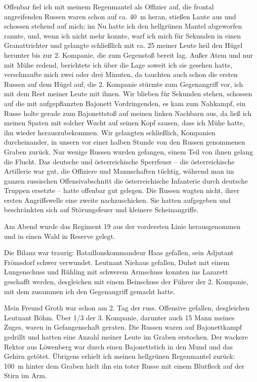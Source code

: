 \documentclass[a5paper,pagesize,10pt,twoside=true]{scrbook}
\begin{document}
Offenbar fiel ich mit meinem Regenmantel als Offizier auf, die frontal angreifenden Russen waren schon auf ca. 40~m heran, stießen Laute aus und schossen stehend auf mich; im Nu hatte ich den hellgrünen Mantel abgeworfen rannte, und, wenn ich nicht mehr konnte, warf ich mich für Sekunden in einen Granattrichter und gelangte schließlich mit ca. 25 meiner Leute heil den Hügel herunter bis zur 2. Kompanie, die zum Gegenstoß bereit lag. Außer Atem und nur mit Mühe redend, berichtete ich über die Lage soweit ich sie gesehen hatte, verschnaufte mich zwei oder drei Minuten, da tauchten auch schon die ersten Russen auf dem Hügel auf, die 2. Kompanie stürmte zum Gegenangriff vor, ich mit dem Rest meiner Leute mit ihnen. Wir blieben für Sekunden stehen, schossen auf die mit aufgepflanzten Bajonett Vordringenden, es kam zum Nahkampf, ein Russe holte gerade zum Bajonettstoß auf meinen linken Nachbarn aus, da ließ ich meinen Spaten mit solcher Wucht auf seinen Kopf sausen, dass ich Mühe hatte, ihn wieder herauszubekommen. Wir gelangten schließlich, Kompanien durcheinander, in unsern vor einer halben Stunde von den Russen genommenen Graben zurück. Nur wenige Russen wurden gefangen, einem Teil von ihnen gelang die Flucht. Das deutsche und österreichische Sperrfeuer -- die österreichische Artillerie war gut, die Offiziere und Mannschaften tüchtig, während man im ganzen russischen Offensivabschnitt die österreichische Infanterie durch deutsche Truppen ersetzte -- hatte offenbar gut gelegen. Die Russen wagten nicht, ihrer ersten Angriffswelle eine zweite nachzuschicken. Sie hatten aufgegeben und beschränkten sich auf Störungsfeuer und kleinere Scheinangriffe.

Am Abend wurde das Regiment 19 aus der vordersten Linie herausgenommen und in einen Wald in Reserve gelegt.

Die Bilanz war traurig: Bataillonskommandeur Haas gefallen, sein Adjutant Frömsdorf schwer verwundet. Leutnant Niehaus gefallen, Duhst mit einem Lungenschuss und Rühling mit schwerem Armschuss konnten ins Lazarett geschafft werden, desgleichen mit einem Beinschuss der Führer der 2. Kompanie, mit dem zusammen ich den Gegenangriff gemacht hatte.

Mein Freund Groth war schon am 2. Tag der russ. Offensive gefallen, desgleichen Leutnant Böhm. Über 1/3 der 3. Kompanie, darunter auch 15 Mann meines Zuges, waren in Gefangenschaft geraten. Die Russen waren auf Bajonettkampf gedrillt und hatten eine Anzahl meiner Leute im Graben erstochen. Der wackere Rektor aus Löwenberg war durch einen Bajonettstich in den Mund und das Gehirn getötet. Übrigens erhielt ich meinen hellgrünen Regenmantel zurück: 100~m hinter dem Graben hielt ihn ein toter Russe mit einem Blutfleck auf der Stirn im Arm.
\end{document}
